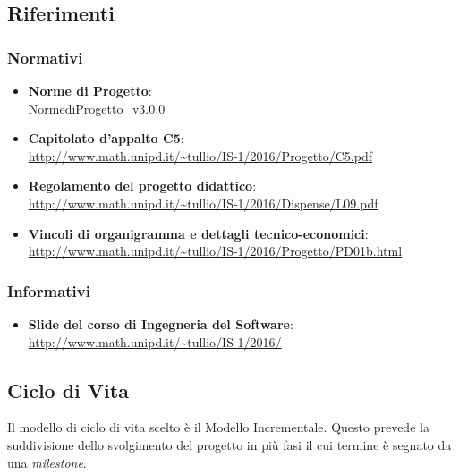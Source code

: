 \subsection{Riferimenti}

\subsubsection{Normativi}
\begin{itemize}
\item \textbf{Norme di Progetto}: \\ NormediProgetto\_v3.0.0
\item \textbf{Capitolato d'appalto C5}: \\ \url{http://www.math.unipd.it/~tullio/IS-1/2016/Progetto/C5.pdf}
\item \textbf{Regolamento del progetto didattico}: \\ \url{http://www.math.unipd.it/~tullio/IS-1/2016/Dispense/L09.pdf}
\item \textbf{Vincoli di organigramma e dettagli tecnico-economici}: \\ \url{http://www.math.unipd.it/~tullio/IS-1/2016/Progetto/PD01b.html}

\end{itemize}


\subsubsection{Informativi}
\begin{itemize}
\item \textbf{Slide del corso di Ingegneria del Software}: \\  \url{http://www.math.unipd.it/~tullio/IS-1/2016/ }
\end{itemize}

\subsection{Ciclo di Vita}

Il modello di ciclo di vita scelto è il Modello Incrementale. Questo prevede la suddivisione dello svolgimento del progetto in più fasi il cui termine è segnato da una \textit{milestone}. \\

